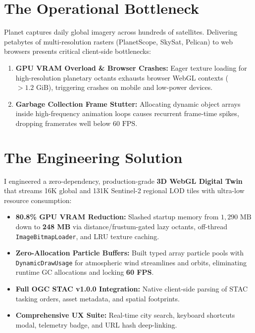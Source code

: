 \documentclass[10pt,letterpaper]{article}
\begin{document}
\noindent
\begin{minipage}[t]{0.51\textwidth}
    \section*{The Operational Bottleneck}
    \footnotesize
    Planet captures daily global imagery across hundreds of satellites. Delivering petabytes of multi-resolution rasters (PlanetScope, SkySat, Pelican) to web browsers presents critical client-side bottlenecks:
    \begin{enumerate}[leftmargin=12pt,topsep=1pt,itemsep=1pt,parsep=0pt]
        \item \textbf{GPU VRAM Overload \& Browser Crashes:} Eager texture loading for high-resolution planetary octants exhausts browser WebGL contexts ($> 1.2\text{ GiB}$), triggering crashes on mobile and low-power devices.
        \item \textbf{Garbage Collection Frame Stutter:} Allocating dynamic object arrays inside high-frequency animation loops causes recurrent frame-time spikes, dropping framerates well below $60\text{ FPS}$.
    \end{enumerate}

    \section*{The Engineering Solution}
    \footnotesize
    I engineered a zero-dependency, production-grade \textbf{3D WebGL Digital Twin} that streams 16K global and 131K Sentinel-2 regional LOD tiles with ultra-low resource consumption:
    \begin{itemize}[leftmargin=12pt,topsep=1pt,itemsep=1pt,parsep=0pt]
        \item \textbf{80.8\% GPU VRAM Reduction:} Slashed startup memory from $1,290\text{ MB}$ down to \textbf{248 MB} via distance/frustum-gated lazy octants, off-thread \texttt{ImageBitmapLoader}, and LRU texture caching.
        \item \textbf{Zero-Allocation Particle Buffers:} Built typed array particle pools with \texttt{DynamicDrawUsage} for atmospheric wind streamlines and orbits, eliminating runtime GC allocations and locking \textbf{60 FPS}.
        \item \textbf{Full OGC STAC v1.0.0 Integration:} Native client-side parsing of STAC tasking orders, asset metadata, and spatial footprints.
        \item \textbf{Comprehensive UX Suite:} Real-time city search, keyboard shortcuts modal, telemetry badge, and URL hash deep-linking.
    \end{itemize}


\end{minipage}
\end{document}
